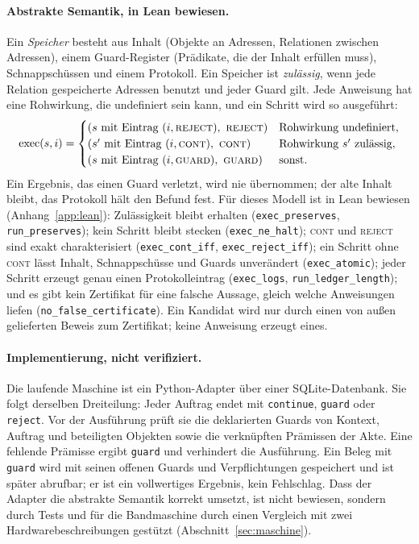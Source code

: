 \paragraph{Abstrakte Semantik, in Lean bewiesen.} Ein \emph{Speicher} besteht aus Inhalt (Objekte an Adressen, Relationen zwischen
Adressen), einem Guard-Register (Prädikate, die der Inhalt erfüllen muss), Schnappschüssen und einem Protokoll. Ein Speicher ist
\emph{zulässig}, wenn jede Relation gespeicherte Adressen benutzt und jeder Guard gilt. Jede Anweisung hat eine Rohwirkung, die undefiniert
sein kann, und ein Schritt wird so ausgeführt:
\[
\mathrm{exec}(s,i)=\begin{cases}
(s\ \text{mit Eintrag }(i,\textsc{reject}),\ \textsc{reject}) & \text{Rohwirkung undefiniert},\\
(s'\ \text{mit Eintrag }(i,\textsc{cont}),\ \textsc{cont}) & \text{Rohwirkung } s' \text{ zulässig},\\
(s\ \text{mit Eintrag }(i,\textsc{guard}),\ \textsc{guard}) & \text{sonst.}
\end{cases}
\]
Ein Ergebnis, das einen Guard verletzt, wird nie übernommen; der alte Inhalt bleibt, das Protokoll hält den Befund fest. Für dieses Modell
ist in Lean bewiesen (Anhang~\ref{app:lean}): Zulässigkeit bleibt erhalten (\texttt{exec\_preserves}, \texttt{run\_preserves}); kein Schritt
bleibt stecken (\texttt{exec\_ne\_halt}); \textsc{cont} und \textsc{reject} sind exakt charakterisiert (\texttt{exec\_cont\_iff},
\texttt{exec\_reject\_iff}); ein Schritt ohne \textsc{cont} lässt Inhalt, Schnappschüsse und Guards unverändert (\texttt{exec\_atomic}); jeder
Schritt erzeugt genau einen Protokolleintrag (\texttt{exec\_logs}, \texttt{run\_ledger\_length}); und es gibt kein Zertifikat für eine falsche
Aussage, gleich welche Anweisungen liefen (\texttt{no\_false\_certificate}). Ein Kandidat wird nur durch einen von außen gelieferten Beweis
zum Zertifikat; keine Anweisung erzeugt eines.

\paragraph{Implementierung, nicht verifiziert.} Die laufende Maschine ist ein Python-Adapter über einer SQLite-Datenbank. Sie folgt
derselben Dreiteilung: Jeder Auftrag endet mit \texttt{continue}, \texttt{guard} oder \texttt{reject}. Vor der Ausführung prüft sie die
deklarierten Guards von Kontext, Auftrag und beteiligten Objekten sowie die verknüpften Prämissen der Akte. Eine fehlende Prämisse ergibt
\texttt{guard} und verhindert die Ausführung. Ein Beleg mit \texttt{guard} wird mit seinen offenen Guards und Verpflichtungen
gespeichert und ist später abrufbar; er ist ein vollwertiges Ergebnis, kein Fehlschlag. Dass der Adapter die abstrakte Semantik korrekt
umsetzt, ist nicht bewiesen, sondern durch Tests und für die Bandmaschine durch einen Vergleich mit zwei Hardwarebeschreibungen gestützt
(Abschnitt~\ref{sec:maschine}).

